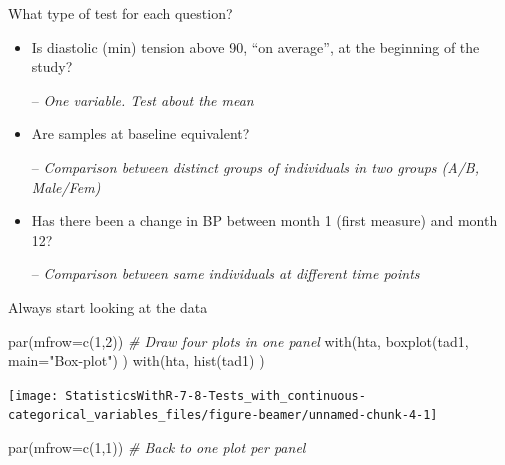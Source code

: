 \documentclass[
  ignorenonframetext,
]{beamer}
\newenvironment{Shaded}{\begin{snugshade}}{\end{snugshade}}
\newcommand{\AttributeTok}[1]{\textcolor[rgb]{0.77,0.63,0.00}{#1}}
\newcommand{\CommentTok}[1]{\textcolor[rgb]{0.56,0.35,0.01}{\textit{#1}}}
\newcommand{\DecValTok}[1]{\textcolor[rgb]{0.00,0.00,0.81}{#1}}
\newcommand{\FunctionTok}[1]{\textcolor[rgb]{0.00,0.00,0.00}{#1}}
\newcommand{\NormalTok}[1]{#1}
\newcommand{\StringTok}[1]{\textcolor[rgb]{0.31,0.60,0.02}{#1}}
\begin{document}
\begin{frame}{What type of test for each question?}
\protect\hypertarget{what-type-of-test-for-each-question}{}
\begin{itemize}
\item
  Is diastolic (min) tension above 90, ``on average'', at the beginning
  of the study?

  -- \emph{One variable. Test about the mean}
\item
  Are samples at baseline equivalent?

  -- \emph{Comparison between distinct groups of individuals in two
  groups (A/B, Male/Fem)}
\item
  Has there been a change in BP between month 1 (first measure) and
  month 12?

  -- \emph{Comparison between same individuals at different time points}
\end{itemize}
\end{frame}

\begin{frame}[fragile]{Always start looking at the data}
\protect\hypertarget{always-start-looking-at-the-data}{}
\begin{Shaded}
\begin{Highlighting}[]
\FunctionTok{par}\NormalTok{(}\AttributeTok{mfrow=}\FunctionTok{c}\NormalTok{(}\DecValTok{1}\NormalTok{,}\DecValTok{2}\NormalTok{)) }\CommentTok{\# Draw four plots in one panel }
\FunctionTok{with}\NormalTok{(hta, }\FunctionTok{boxplot}\NormalTok{(tad1, }\AttributeTok{main=}\StringTok{"Box{-}plot"}\NormalTok{) )}
\FunctionTok{with}\NormalTok{(hta, }\FunctionTok{hist}\NormalTok{(tad1) )}
\end{Highlighting}
\end{Shaded}

\texttt{[image: StatisticsWithR-7-8-Tests\_with\_continuous-categorical\_variables\_files/figure-beamer/unnamed-chunk-4-1]}

\begin{Shaded}
\begin{Highlighting}[]
\FunctionTok{par}\NormalTok{(}\AttributeTok{mfrow=}\FunctionTok{c}\NormalTok{(}\DecValTok{1}\NormalTok{,}\DecValTok{1}\NormalTok{)) }\CommentTok{\# Back to one plot per panel}
\end{Highlighting}
\end{Shaded}
\end{frame}
\end{document}
